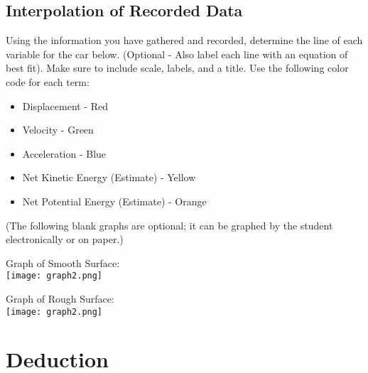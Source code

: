 \documentclass[12pt, letterpaper]{report}
\begin{document}
    \section{Interpolation of Recorded Data}
      \par Using the information you have gathered and recorded, determine the line of each variable for the car below. (Optional - Also label each line with an equation of best fit). Make sure to include scale, labels, and a title. Use the following color code for each term:
      \begin{itemize}
        \item{Displacement - Red}
        \item{Velocity - Green}
        \item{Acceleration - Blue}
        \item{Net Kinetic Energy (Estimate) - Yellow}
        \item{Net Potential Energy (Estimate) - Orange}
      \end{itemize}
      (The following blank graphs are optional; it can be graphed by the student electronically or on paper.) \\
      \pagebreak
      \begin{center}
        Graph of Smooth Surface: \\
        \texttt{[image: graph2.png]}
      \end{center}
      \vfill
      \begin{center}
        Graph of Rough Surface: \\
        \texttt{[image: graph2.png]}
      \end{center}
      \pagebreak
  \chapter{Deduction}
\end{document}
